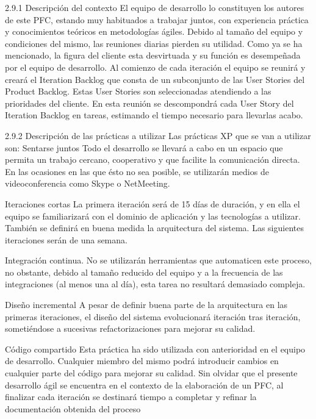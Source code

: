 2.9.1 Descripción del contexto 
El  equipo  de  desarrollo  lo  constituyen  los  autores  de  este  PFC,  estando  muy  habituados  a  trabajar  juntos,  con  experiencia  práctica  y  conocimientos  teóricos  en metodologías  ágiles.    Debido  al  tamaño  del  equipo  y  condiciones  del  mismo,  las  reuniones  diarias pierden su utilidad.  Como ya se ha mencionado, la figura del cliente esta desvirtuada y su función es desempeñada por el equipo de desarrollo. 
 Al comienzo de cada iteración el equipo se reunirá y creará el Iteration Backlog que consta de  un subconjunto de las User Stories del Product Backlog. Estas User Stories son seleccionadas  atendiendo a las prioridades del cliente. En esta reunión se descompondrá cada User Story del Iteration Backlog en tareas, estimando el tiempo necesario para llevarlas acabo. 


2.9.2 Descripción de las prácticas a utilizar 
Las prácticas XP que se van a utilizar son: 
Sentarse juntos 
Todo el desarrollo se llevará a cabo en un espacio que permita un trabajo cercano, cooperativo y  que  facilite  la  comunicación  directa.  En  las  ocasiones  en  las  que  ésto  no  sea  posible,  se utilizarán medios de videoconferencia como Skype o NetMeeting. 

Iteraciones cortas 
La  primera  iteración  será  de  15  días  de  duración,  y    en  ella  el  equipo  se  familiarizará  con  el  dominio  de  aplicación  y  las  tecnologías  a  utilizar.  También  se  definirá  en  buena  medida  la arquitectura del sistema.  
Las siguientes iteraciones serán de una semana. 
 
Integración continua. 
No se utilizarán herramientas que automaticen este proceso, no obstante, debido al tamaño  reducido del equipo y a la frecuencia de las integraciones (al menos una al día), esta tarea no resultará demasiado compleja. 

 Diseño incremental 
A  pesar  de  definir  buena  parte  de  la  arquitectura  en  las  primeras  iteraciones,  el  diseño  del  sistema evolucionará iteración tras iteración, sometiéndose a sucesivas refactorizaciones para mejorar su calidad.  

 Código compartido 
Esta práctica ha sido utilizada con anterioridad en el equipo de desarrollo. Cualquier miembro del mismo podrá introducir cambios en cualquier parte del código para mejorar su calidad. Sin olvidar que el presente desarrollo ágil se encuentra en el contexto de la elaboración de un PFC,  al  finalizar  cada  iteración  se  destinará  tiempo  a  completar  y  refinar  la  documentación obtenida del proceso


